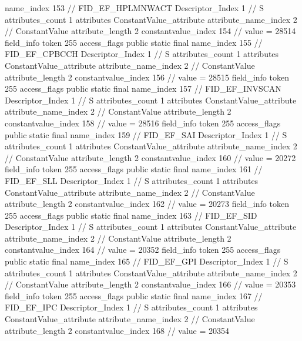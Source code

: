 {{{{{				name_index	153		// FID_EF_HPLMNWACT
				Descriptor_Index	1		// S
				attributes_count	1
				attributes {
				ConstantValue_attribute {
					attribute_name_index	2		// ConstantValue
					attribute_length	2
					constantvalue_index	154		// value = 28514
				}
				}
			}
			field_info {
				token	255
				access_flags	public static final
				name_index	155		// FID_EF_CPBCCH
				Descriptor_Index	1		// S
				attributes_count	1
				attributes {
				ConstantValue_attribute {
					attribute_name_index	2		// ConstantValue
					attribute_length	2
					constantvalue_index	156		// value = 28515
				}
				}
			}
			field_info {
				token	255
				access_flags	public static final
				name_index	157		// FID_EF_INVSCAN
				Descriptor_Index	1		// S
				attributes_count	1
				attributes {
				ConstantValue_attribute {
					attribute_name_index	2		// ConstantValue
					attribute_length	2
					constantvalue_index	158		// value = 28516
				}
				}
			}
			field_info {
				token	255
				access_flags	public static final
				name_index	159		// FID_EF_SAI
				Descriptor_Index	1		// S
				attributes_count	1
				attributes {
				ConstantValue_attribute {
					attribute_name_index	2		// ConstantValue
					attribute_length	2
					constantvalue_index	160		// value = 20272
				}
				}
			}
			field_info {
				token	255
				access_flags	public static final
				name_index	161		// FID_EF_SLL
				Descriptor_Index	1		// S
				attributes_count	1
				attributes {
				ConstantValue_attribute {
					attribute_name_index	2		// ConstantValue
					attribute_length	2
					constantvalue_index	162		// value = 20273
				}
				}
			}
			field_info {
				token	255
				access_flags	public static final
				name_index	163		// FID_EF_SID
				Descriptor_Index	1		// S
				attributes_count	1
				attributes {
				ConstantValue_attribute {
					attribute_name_index	2		// ConstantValue
					attribute_length	2
					constantvalue_index	164		// value = 20352
				}
				}
			}
			field_info {
				token	255
				access_flags	public static final
				name_index	165		// FID_EF_GPI
				Descriptor_Index	1		// S
				attributes_count	1
				attributes {
				ConstantValue_attribute {
					attribute_name_index	2		// ConstantValue
					attribute_length	2
					constantvalue_index	166		// value = 20353
				}
				}
			}
			field_info {
				token	255
				access_flags	public static final
				name_index	167		// FID_EF_IPC
				Descriptor_Index	1		// S
				attributes_count	1
				attributes {
				ConstantValue_attribute {
					attribute_name_index	2		// ConstantValue
					attribute_length	2
					constantvalue_index	168		// value = 20354
}}}}}}}
